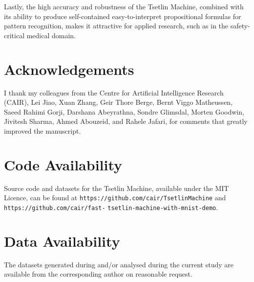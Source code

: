 \documentclass[11pt,a4paper]{article}
\begin{document}
Lastly, the high accuracy and robustness of the Tsetlin Machine, combined with its ability to produce self-contained easy-to-interpret propositional formulas for pattern recognition, makes it attractive for applied research, such as in the safety-critical medical domain.

\section*{Acknowledgements}
I thank my colleagues from the Centre for Artificial Intelligence Research (CAIR), Lei Jiao, Xuan Zhang, Geir Thore Berge, Bernt Viggo Matheussen, Saeed Rahimi Gorji, Darshana Abeyrathna, Sondre Glimsdal, Morten Goodwin, Jivitesh Sharma, Ahmed Abouzeid, and Rahele Jafari, for comments that greatly improved the manuscript.

\section*{Code Availability}
Source code and datasets for the Tsetlin Machine, available under the MIT Licence, can be found at {\tt https://github.com/cair/TsetlinMachine} and {\tt https://github.com/cair/fast-} {\tt tsetlin-machine-with-mnist-demo}.

\section*{Data Availability}
The datasets generated during and/or analysed during the current study are available from the corresponding author on reasonable request. 



\end{document}

